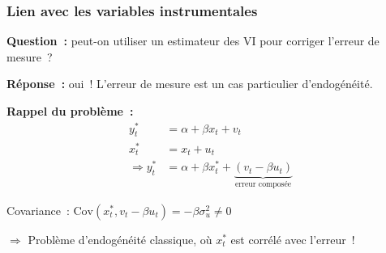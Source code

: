 \documentclass[10pt]{beamer}
\begin{document}
\begin{frame}
  \frametitle{Lien avec les variables instrumentales}

  \textbf{Question~:} peut-on utiliser un estimateur des VI pour corriger
  l'erreur de mesure~?

  \medskip

  \textbf{Réponse~:} oui~! L'erreur de mesure est un cas particulier
  d'endogénéité.

  \medskip

  \textbf{Rappel du problème~:}
  \begin{align*}
    y_t^* &= \alpha + \beta x_t + v_t \\
    x_t^* &= x_t + u_t \\
    \Rightarrow y_t^* &= \alpha + \beta x_t^* + \underbrace{\left(v_t - \beta u_t\right)}_{\text{erreur composée}}
  \end{align*}

  \medskip

  Covariance~: $\mathrm{Cov}\left(x_t^*, v_t - \beta u_t\right) = -\beta\sigma_u^2 \neq 0$

  \medskip

  $\Rightarrow$ Problème d'endogénéité classique, où $x_t^*$ est corrélé avec
  l'erreur~!

\end{frame}
\end{document}
